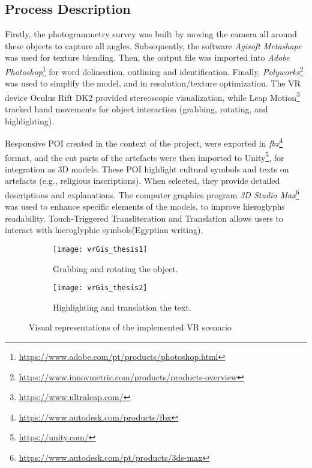 \subsection*{Process Description}

Firstly, the photogrammetry survey was built by moving the camera all around these objects to capture all angles. Subsequently, the software \textit{Agisoft Metashape} was used for texture blending. Then, the output file was imported into \textit{Adobe Photoshop}\footnote{\url{https://www.adobe.com/pt/products/photoshop.html}} for word delineation, outlining and identification. 
Finally, \textit{Polyworks}\footnote{\url{https://www.innovmetric.com/products/products-overview}} was used to simplify the model, and in resolution/texture optimization.
The \gls{VR} device Oculus Rift DK2 provided stereoscopic visualization, while Leap Motion\footnote{\url{https://www.ultraleap.com/}} tracked hand movements for object interaction (grabbing, rotating, and highlighting).

Responsive \gls{POI} created in the context of the project, were exported in \textit{fbx}\footnote{\url{https://www.autodesk.com/products/fbx}} format, and the cut parts of the artefacts were then imported to Unity\footnote{\url{https://unity.com/}}, for integration as \gls{3D} models.
These \gls{POI} highlight cultural symbols and texts on artefacts (e.g., religious inscriptions). When selected, they provide detailed descriptions and explanations.
The computer graphics program \textit{\gls{3D} Studio Max}\footnote{\url{https://www.autodesk.com/pt/products/3ds-max}} was used to enhance specific elements of the models, to improve hieroglyphs readability.
Touch-Triggered Transliteration and Translation allows users to interact with hieroglyphic symbols(Egyptian writing). 


\begin{figure}[h!]
  \centering
  \begin{subfigure}[b]{0.45\textwidth}
      \centering
      \texttt{[image: vrGis\_thesis1]}
      \caption{Grabbing and rotating the object.}
      \label{fig:vrGis_thesis1}
  \end{subfigure}
  \hfill
  \begin{subfigure}[b]{0.45\textwidth}
      \centering
      \texttt{[image: vrGis\_thesis2]}
      \caption{Highlighting and translation the text.}
      \label{fig:vrGis_thesis2}
  \end{subfigure}
     \caption{Visual representations of the implemented \gls{VR} scenario}
     \label{fig:vrGis_thesis}
\end{figure}

